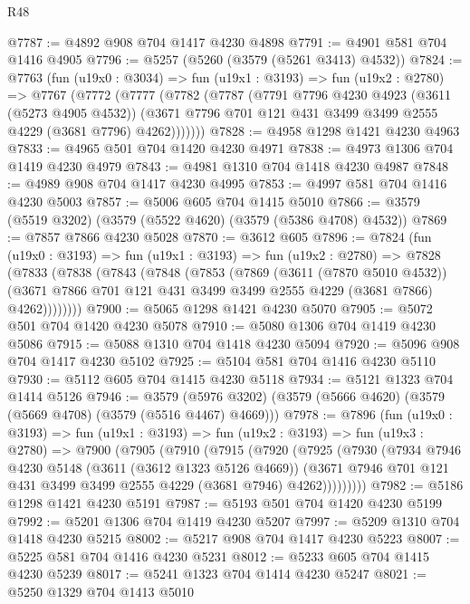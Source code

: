 \begin{lexlean}{R48}
\begin{coremodule}
@7787 := @4892 @908 @704 @1417 @4230 @4898
@7791 := @4901 @581 @704 @1416 @4905
@7796 := @5257 (@5260 (@3579 (@5261 @3413) @4532))
@7824 := @7763
    (fun (u19x0 : @3034) =>
    fun (u19x1 : @3193) =>
    fun (u19x2 : @2780) =>
    @7767
      (@7772
        (@7777
          (@7782
            (@7787
              (@7791
                @7796
                @4230
                @4923
                (@3611 (@5273 @4905 @4532))
                (@3671 @7796 @701 @121 @431 @3499 @3499 @2555 @4229 (@3681 @7796) @4262)))))))
@7828 := @4958 @1298 @1421 @4230 @4963
@7833 := @4965 @501 @704 @1420 @4230 @4971
@7838 := @4973 @1306 @704 @1419 @4230 @4979
@7843 := @4981 @1310 @704 @1418 @4230 @4987
@7848 := @4989 @908 @704 @1417 @4230 @4995
@7853 := @4997 @581 @704 @1416 @4230 @5003
@7857 := @5006 @605 @704 @1415 @5010
@7866 := @3579 (@5519 @3202) (@3579 (@5522 @4620) (@3579 (@5386 @4708) @4532))
@7869 := @7857 @7866 @4230 @5028
@7870 := @3612 @605
@7896 := @7824
    (fun (u19x0 : @3193) =>
    fun (u19x1 : @3193) =>
    fun (u19x2 : @2780) =>
    @7828
      (@7833
        (@7838
          (@7843
            (@7848
              (@7853
                (@7869
                  (@3611 (@7870 @5010 @4532))
                  (@3671 @7866 @701 @121 @431 @3499 @3499 @2555 @4229 (@3681 @7866) @4262))))))))
@7900 := @5065 @1298 @1421 @4230 @5070
@7905 := @5072 @501 @704 @1420 @4230 @5078
@7910 := @5080 @1306 @704 @1419 @4230 @5086
@7915 := @5088 @1310 @704 @1418 @4230 @5094
@7920 := @5096 @908 @704 @1417 @4230 @5102
@7925 := @5104 @581 @704 @1416 @4230 @5110
@7930 := @5112 @605 @704 @1415 @4230 @5118
@7934 := @5121 @1323 @704 @1414 @5126
@7946 := @3579 (@5976 @3202) (@3579 (@5666 @4620) (@3579 (@5669 @4708) (@3579 (@5516 @4467) @4669)))
@7978 := @7896
    (fun (u19x0 : @3193) =>
    fun (u19x1 : @3193) =>
    fun (u19x2 : @3193) =>
    fun (u19x3 : @2780) =>
    @7900
      (@7905
        (@7910
          (@7915
            (@7920
              (@7925
                (@7930
                  (@7934
                    @7946
                    @4230
                    @5148
                    (@3611 (@3612 @1323 @5126 @4669))
                    (@3671 @7946 @701 @121 @431 @3499 @3499 @2555 @4229 (@3681 @7946) @4262)))))))))
@7982 := @5186 @1298 @1421 @4230 @5191
@7987 := @5193 @501 @704 @1420 @4230 @5199
@7992 := @5201 @1306 @704 @1419 @4230 @5207
@7997 := @5209 @1310 @704 @1418 @4230 @5215
@8002 := @5217 @908 @704 @1417 @4230 @5223
@8007 := @5225 @581 @704 @1416 @4230 @5231
@8012 := @5233 @605 @704 @1415 @4230 @5239
@8017 := @5241 @1323 @704 @1414 @4230 @5247
@8021 := @5250 @1329 @704 @1413 @5010

\end{coremodule}
\end{lexlean}
